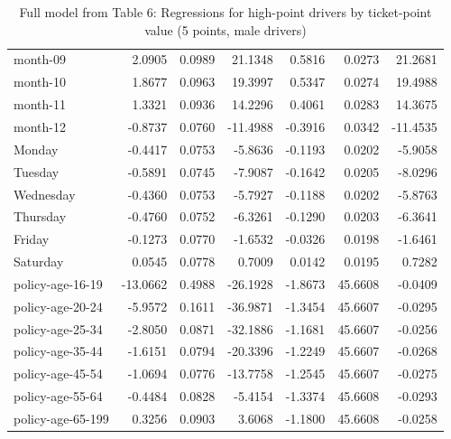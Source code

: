 \documentclass[10pt]{article}
\begin{document}
\begin{table}[ht]
\begin{tabular}{lrrrrrr}
  month-09 & 2.0905 & 0.0989 & 21.1348 & 0.5816 & 0.0273 & 21.2681 \\ 
  month-10 & 1.8677 & 0.0963 & 19.3997 & 0.5347 & 0.0274 & 19.4988 \\ 
  month-11 & 1.3321 & 0.0936 & 14.2296 & 0.4061 & 0.0283 & 14.3675 \\ 
  month-12 & -0.8737 & 0.0760 & -11.4988 & -0.3916 & 0.0342 & -11.4535 \\ 
  Monday & -0.4417 & 0.0753 & -5.8636 & -0.1193 & 0.0202 & -5.9058 \\ 
  Tuesday & -0.5891 & 0.0745 & -7.9087 & -0.1642 & 0.0205 & -8.0296 \\ 
  Wednesday & -0.4360 & 0.0753 & -5.7927 & -0.1188 & 0.0202 & -5.8763 \\ 
  Thursday & -0.4760 & 0.0752 & -6.3261 & -0.1290 & 0.0203 & -6.3641 \\ 
  Friday & -0.1273 & 0.0770 & -1.6532 & -0.0326 & 0.0198 & -1.6461 \\ 
  Saturday & 0.0545 & 0.0778 & 0.7009 & 0.0142 & 0.0195 & 0.7282 \\ 
  policy-age-16-19 & -13.0662 & 0.4988 & -26.1928 & -1.8673 & 45.6608 & -0.0409 \\ 
  policy-age-20-24 & -5.9572 & 0.1611 & -36.9871 & -1.3454 & 45.6607 & -0.0295 \\ 
  policy-age-25-34 & -2.8050 & 0.0871 & -32.1886 & -1.1681 & 45.6607 & -0.0256 \\ 
  policy-age-35-44 & -1.6151 & 0.0794 & -20.3396 & -1.2249 & 45.6607 & -0.0268 \\ 
  policy-age-45-54 & -1.0694 & 0.0776 & -13.7758 & -1.2545 & 45.6607 & -0.0275 \\ 
  policy-age-55-64 & -0.4484 & 0.0828 & -5.4154 & -1.3374 & 45.6608 & -0.0293 \\ 
  policy-age-65-199 & 0.3256 & 0.0903 & 3.6068 & -1.1800 & 45.6608 & -0.0258 \\ 
   \hline
\end{tabular}
\caption{Full model from Table 6: Regressions for high-point drivers by ticket-point value (5 points, male drivers)} 
\label{tab_6_5_pts_M}
\end{table}


\clearpage
\pagebreak



\end{document}
